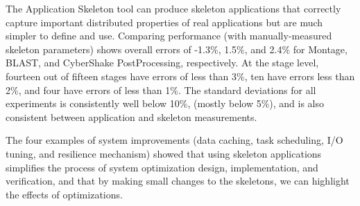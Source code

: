 \documentclass[preprint,12pt]{elsarticle}
\newcommand{\katznote}[1]{ {\textcolor{blue}    { ***Dan:   #1 }}}
\newcommand{\zhaonote}[1]{{\textcolor{cyan}{ ***Zhao:  #1 }}}
\newcommand{\katznote}[1]{}
\newcommand{\zhaonote}[1]{}
\begin{document}



The Application Skeleton tool can produce skeleton applications that correctly capture important distributed properties of real applications but 
are much simpler to define and use.
Comparing performance (with manually-measured skeleton parameters) shows overall errors of  -1.3\%, 1.5\%, and 2.4\%  for Montage, BLAST, and CyberShake PostProcessing, respectively.
At the stage level, fourteen out of fifteen stages have errors of less than 3\%,
ten have errors less than 2\%, and four have errors of less than 1\%.  The
standard deviations for all experiments is consistently well below 10\%, (mostly
below 5\%), and is also consistent between application and skeleton measurements.

The four examples of system improvements (data caching, task scheduling, I/O tuning, and resilience mechanism) 
showed that using skeleton applications simplifies the process of system optimization design, implementation, and verification, and that by making small changes to the skeletons, we can highlight the effects of optimizations.
\end{document}
